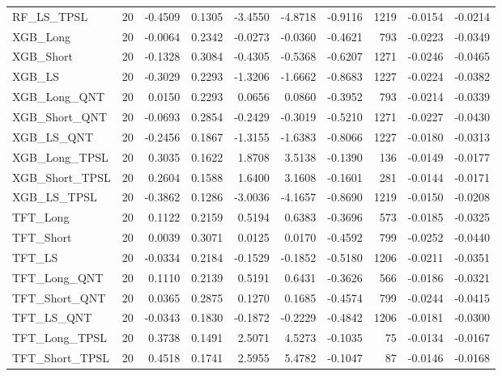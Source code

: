 \begin{tabular}{llrrrrrrrr}
\cline{1-10}
RF\_LS\_TPSL & 20 & -0.4509 & 0.1305 & -3.4550 & -4.8718 & -0.9116 & 1219 & -0.0154 & -0.0214 \\
\cline{1-10}
XGB\_Long & 20 & -0.0064 & 0.2342 & -0.0273 & -0.0360 & -0.4621 & 793 & -0.0223 & -0.0349 \\
\cline{1-10}
XGB\_Short & 20 & -0.1328 & 0.3084 & -0.4305 & -0.5368 & -0.6207 & 1271 & -0.0246 & -0.0465 \\
\cline{1-10}
XGB\_LS & 20 & -0.3029 & 0.2293 & -1.3206 & -1.6662 & -0.8683 & 1227 & -0.0224 & -0.0382 \\
\cline{1-10}
XGB\_Long\_QNT & 20 & 0.0150 & 0.2293 & 0.0656 & 0.0860 & -0.3952 & 793 & -0.0214 & -0.0339 \\
\cline{1-10}
XGB\_Short\_QNT & 20 & -0.0693 & 0.2854 & -0.2429 & -0.3019 & -0.5210 & 1271 & -0.0227 & -0.0430 \\
\cline{1-10}
XGB\_LS\_QNT & 20 & -0.2456 & 0.1867 & -1.3155 & -1.6383 & -0.8066 & 1227 & -0.0180 & -0.0313 \\
\cline{1-10}
XGB\_Long\_TPSL & 20 & 0.3035 & 0.1622 & 1.8708 & 3.5138 & -0.1390 & 136 & -0.0149 & -0.0177 \\
\cline{1-10}
XGB\_Short\_TPSL & 20 & 0.2604 & 0.1588 & 1.6400 & 3.1608 & -0.1601 & 281 & -0.0144 & -0.0171 \\
\cline{1-10}
XGB\_LS\_TPSL & 20 & -0.3862 & 0.1286 & -3.0036 & -4.1657 & -0.8690 & 1219 & -0.0150 & -0.0208 \\
\cline{1-10}
TFT\_Long & 20 & 0.1122 & 0.2159 & 0.5194 & 0.6383 & -0.3696 & 573 & -0.0185 & -0.0325 \\
\cline{1-10}
TFT\_Short & 20 & 0.0039 & 0.3071 & 0.0125 & 0.0170 & -0.4592 & 799 & -0.0252 & -0.0440 \\
\cline{1-10}
TFT\_LS & 20 & -0.0334 & 0.2184 & -0.1529 & -0.1852 & -0.5180 & 1206 & -0.0211 & -0.0351 \\
\cline{1-10}
TFT\_Long\_QNT & 20 & 0.1110 & 0.2139 & 0.5191 & 0.6431 & -0.3626 & 566 & -0.0186 & -0.0321 \\
\cline{1-10}
TFT\_Short\_QNT & 20 & 0.0365 & 0.2875 & 0.1270 & 0.1685 & -0.4574 & 799 & -0.0244 & -0.0415 \\
\cline{1-10}
TFT\_LS\_QNT & 20 & -0.0343 & 0.1830 & -0.1872 & -0.2229 & -0.4842 & 1206 & -0.0181 & -0.0300 \\
\cline{1-10}
TFT\_Long\_TPSL & 20 & 0.3738 & 0.1491 & 2.5071 & 4.5273 & -0.1035 & 75 & -0.0134 & -0.0167 \\
\cline{1-10}
TFT\_Short\_TPSL & 20 & 0.4518 & 0.1741 & 2.5955 & 5.4782 & -0.1047 & 87 & -0.0146 & -0.0168 \\

\end{tabular}
